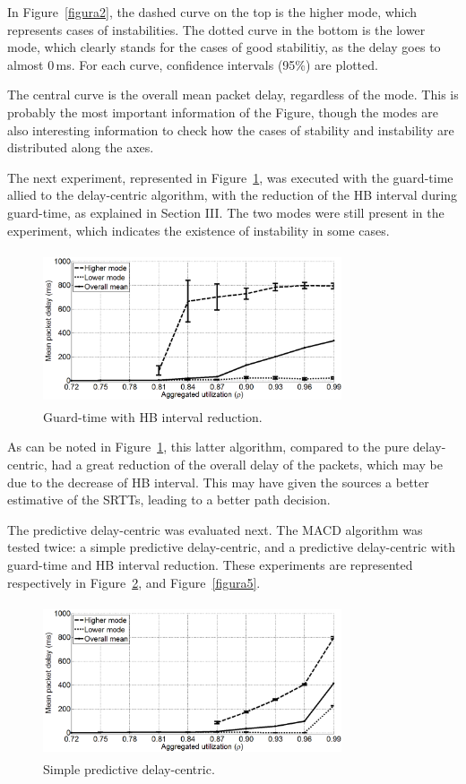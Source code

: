 \documentclass[letterpaper,10pt,oneside,conference,final]{sbrt2015}
\begin{document}
In Figure~\ref{figura2}, the dashed curve on the top is the higher mode, which represents cases of instabilities. The dotted curve in the bottom is the lower mode, which clearly stands for the cases of good stabilitiy, as the delay goes to almost 0\,ms. For each curve, confidence intervals (95\%) are plotted. 

The central curve is the overall mean packet delay, regardless of the mode. This is probably the most important information of the Figure, though the modes are also interesting information to check how the cases of stability and instability are distributed along the axes.

The next experiment, represented in Figure~\ref{figura3}, was executed with the guard-time allied to the delay-centric algorithm, with the reduction of the HB interval during guard-time, as explained in Section III. The two modes were still present in the experiment, which indicates the existence of instability in some cases.

\begin{figure}[h!]
	\centering
	\includegraphics[width=8.8cm,height=4.5cm]{figura3}
	\caption{Guard-time with HB interval reduction.}
	\label{figura3}
\end{figure}

As can be noted in Figure~\ref{figura3}, this latter algorithm, compared to the pure delay-centric, had a great reduction of the overall delay of the packets, which may be due to the decrease of HB interval. This may have given the sources a better estimative of the SRTTs, leading to a better path decision. 

The predictive delay-centric was evaluated next. The MACD algorithm was tested twice: a simple predictive delay-centric, and a predictive delay-centric with guard-time and HB interval reduction. These experiments are represented respectively in Figure~\ref{figura4}, and Figure~\ref{figura5}.


\begin{figure}[h!]
\centering
\includegraphics[width=8.8cm,height=4.5cm]{figura4}
\caption{Simple predictive delay-centric.}
\label{figura4}
\end{figure}
\end{document}
